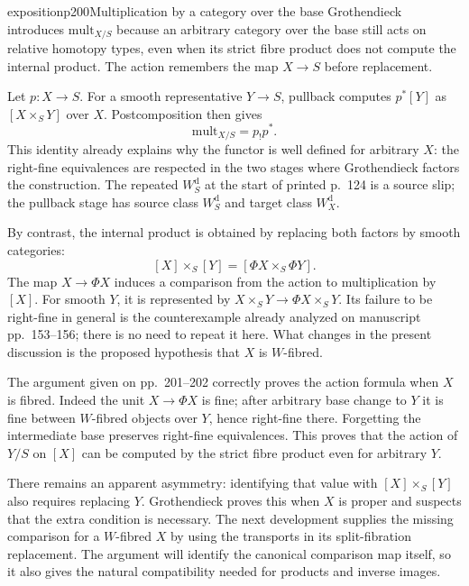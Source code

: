 \begin{dcomment}{exposition}{p200}{Multiplication by a category over the base}
Grothendieck introduces $\mathrm{mult}_{X/S}$ because an arbitrary category over the base still acts on relative homotopy types, even when its strict fibre product does not compute the internal product. The action remembers the map $X\to S$ before replacement.

Let $p:X\to S$. For a smooth representative $Y\to S$, pullback computes $p^*[Y]$ as $[X\times_S Y]$ over $X$. Postcomposition then gives
\[
 \mathrm{mult}_{X/S}=p_!p^*.
\]
This identity already explains why the functor is well defined for arbitrary $X$: the right-fine equivalences are respected in the two stages where Grothendieck factors the construction. The repeated $W_S^{\mathrm d}$ at the start of printed p.~124 is a source slip; the pullback stage has source class $W_S^{\mathrm d}$ and target class $W_X^{\mathrm d}$.

By contrast, the internal product is obtained by replacing both factors by smooth categories:
\[
 [X]\times_S[Y]=[\Phi X\times_S\Phi Y].
\]
The map $X\to\Phi X$ induces a comparison from the action to multiplication by $[X]$. For smooth $Y$, it is represented by $X\times_S Y\to\Phi X\times_S Y$. Its failure to be right-fine in general is the counterexample already analyzed on manuscript pp.~153--156; there is no need to repeat it here. What changes in the present discussion is the proposed hypothesis that $X$ is $W$-fibred.

The argument given on pp.~201--202 correctly proves the action formula when $X$ is fibred. Indeed the unit $X\to\Phi X$ is fine; after arbitrary base change to $Y$ it is fine between $W$-fibred objects over $Y$, hence right-fine there. Forgetting the intermediate base preserves right-fine equivalences. This proves that the action of $Y/S$ on $[X]$ can be computed by the strict fibre product even for arbitrary $Y$.

There remains an apparent asymmetry: identifying that value with $[X]\times_S[Y]$ also requires replacing $Y$. Grothendieck proves this when $X$ is proper and suspects that the extra condition is necessary. The next development supplies the missing comparison for a $W$-fibred $X$ by using the transports in its split-fibration replacement. The argument will identify the canonical comparison map itself, so it also gives the natural compatibility needed for products and inverse images.
\end{dcomment}


